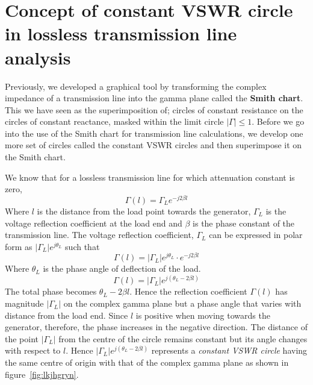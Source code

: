 \section{Concept of constant VSWR circle in lossless transmission line analysis}\label{lec:lec8}
Previously, we developed a graphical tool by transforming the complex impedance of a transmission line into the gamma plane called the \textbf{Smith chart}. This we have seen as the superimposition of; circles of constant resistance on the circles of constant reactance, masked within the limit circle $|\Gamma| \leq 1$. Before we go into the use of the Smith chart for transmission line calculations, we develop one more set of circles called the constant VSWR circles  and then superimpose it on the Smith chart.

We know that for a lossless transmission line for which attenuation constant is zero,
\begin{equation*}
\Gamma(l) =\Gamma_L e^{-j2\beta{l}}
\end{equation*}
Where $l$ is the distance from the load point towards the generator, $\Gamma_{L}$ is the voltage reflection coefficient at the load end and $\beta$ is the phase constant of the transmission line. The voltage reflection coefficient, $\Gamma_L$ can be expressed in polar form as $|\Gamma_{L}|e^{j\theta_L}$ such that
\begin{equation*}
\Gamma{(l)} = |\Gamma_{L}|e^{j\theta_L}\cdot e^{-j2\beta l}
\end{equation*}
Where $\theta_L$ is the phase angle of deflection of the load.
\begin{equation}
\Gamma{(l)} =|\Gamma_L|e^{j(\theta_L - 2\beta{l})}
\end{equation}
The total phase becomes $\theta_L - 2\beta{l}$. Hence the reflection coefficient $\Gamma{(l)}$ has magnitude $|\Gamma_L|$ on the complex gamma plane but a phase angle that varies with distance from the load end. Since $l$ is positive when moving towards the generator, therefore, the phase increases in the negative direction. The distance of the point $|\Gamma_L|$ from the centre of the circle remains constant but its angle changes with respect to $l$. Hence $|\Gamma_L|e^{j(\theta_L - 2\beta l)}$ represents a \emph{constant VSWR circle} having the same centre of origin with that of the complex gamma plane as shown in figure~\ref{fig:lkjhgryn}.

